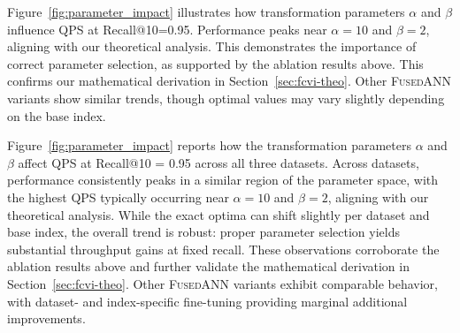 \documentclass[numbers,sort]{article}
\begin{document}
Figure~\ref{fig:parameter_impact} illustrates how transformation parameters $\alpha$ and $\beta$ influence QPS at Recall@10=0.95. Performance peaks near $\alpha=10$ and $\beta=2$, aligning with our theoretical analysis. This demonstrates the importance of correct parameter selection, as supported by the ablation results above. This confirms our mathematical derivation in Section~\ref{sec:fcvi-theo}. Other \textsc{FusedANN} variants show similar trends, though optimal values may vary slightly depending on the base index. 

Figure~\ref{fig:parameter_impact} reports how the transformation parameters $\alpha$ and $\beta$ affect QPS at Recall@10 = 0.95 across all three datasets. Across datasets, performance consistently peaks in a similar region of the parameter space, with the highest QPS typically occurring near $\alpha=10$ and $\beta=2$, aligning with our theoretical analysis. While the exact optima can shift slightly per dataset and base index, the overall trend is robust: proper parameter selection yields substantial throughput gains at fixed recall. These observations corroborate the ablation results above and further validate the mathematical derivation in Section~\ref{sec:fcvi-theo}. Other \textsc{FusedANN} variants exhibit comparable behavior, with dataset- and index-specific fine-tuning providing marginal additional improvements.
\end{document}
